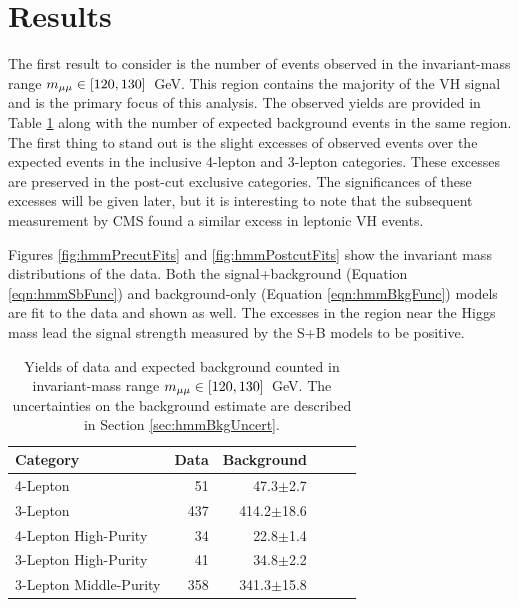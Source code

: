 \section{Results}\label{sec:hmmResults}

The first result to consider is the number of events observed in the invariant-mass range $m_{\mu\mu}\in[120,130]$~GeV.
This region contains the majority of the VH signal and is the primary focus of this analysis.
The observed yields are provided in Table \ref{tab:hmmResultNdat} along with the number of expected background events in the same region.
The first thing to stand out is the slight excesses of observed events over the expected events in the inclusive 4-lepton and 3-lepton categories.
These excesses are preserved in the post-cut exclusive categories.
The significances of these excesses will be given later, but it is interesting to note that the subsequent measurement by CMS found a similar excess in leptonic VH events. 

Figures \ref{fig:hmmPrecutFits} and \ref{fig:hmmPostcutFits} show the invariant mass distributions of the data.
Both the signal+background (Equation \ref{eqn:hmmSbFunc}) and background-only (Equation \ref{eqn:hmmBkgFunc}) models are fit to the data  and shown as well.
The excesses in the region near the Higgs mass lead the signal strength measured by the S+B models to be positive.

\begin{table}[htp]
\begin{center}
\begin{tabular}{l r r r r r}\toprule
Category               & Data    & Background \\
\midrule
4-Lepton               & 51      & 47.3$\pm$2.7 \\
3-Lepton               & 437     & 414.2$\pm$18.6 \\
\midrule
4-Lepton High-Purity   & 34      & 22.8$\pm$1.4 \\
3-Lepton High-Purity   & 41      & 34.8$\pm$2.2 \\
3-Lepton Middle-Purity & 358     & 341.3$\pm$15.8 \\
\bottomrule\end{tabular}\\
\caption{
Yields of data and expected background counted in invariant-mass range $m_{\mu\mu}\in[120,130]$~GeV.
The uncertainties on the background estimate are described in Section \ref{sec:hmmBkgUncert}.
}
\label{tab:hmmResultNdat}
\end{center}
\end{table}


